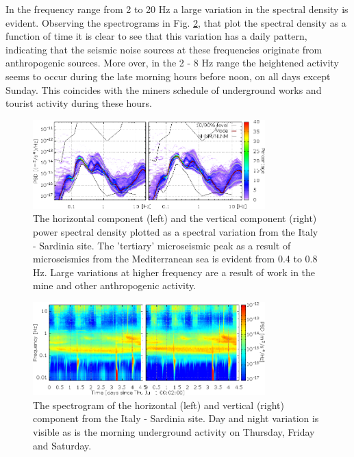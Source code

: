 In the frequency range from 2 to 20 Hz a large variation in the spectral density is evident. Observing the spectrograms in Fig. \ref{fig:Lula-A_multiplot2}, that plot the spectral density as a function of time it is clear to see that this variation has a daily pattern, indicating that the seismic noise sources at these frequencies originate from anthropogenic sources. More over, in the 2 - 8 Hz range the heightened activity seems to occur during the late morning hours before noon, on all days except Sunday. This coincides with the miners schedule of underground works and tourist activity during these hours. 
\begin{figure}[h]
	\begin{center}
		\includegraphics[width= 0.8\textwidth]{./Sec_SiteInfra/Figures/Lula-A_multiplot1}
		\caption{The horizontal component (left) and the vertical component (right) power spectral density plotted as a spectral variation from the Italy - Sardinia site. The 'tertiary' microseismic peak as a result of microseismics from the Mediterranean sea is evident from 0.4 to 0.8 Hz. Large variations at higher frequency are a result of work in the mine and other anthropogenic activity.}
		\label{fig:Lula-A_multiplot1}
	\end{center}
\end{figure}

\begin{figure}[h]	
	\begin{center}
		\includegraphics[width= 0.8\textwidth]{./Sec_SiteInfra/Figures/Lula-A_multiplot2}
		\caption{The spectrogram of the horizontal (left) and vertical (right) component from the Italy - Sardinia site. Day and night variation is visible as is the morning underground activity on Thursday, Friday and Saturday.}
		\label{fig:Lula-A_multiplot2}
	\end{center}
\end{figure}

